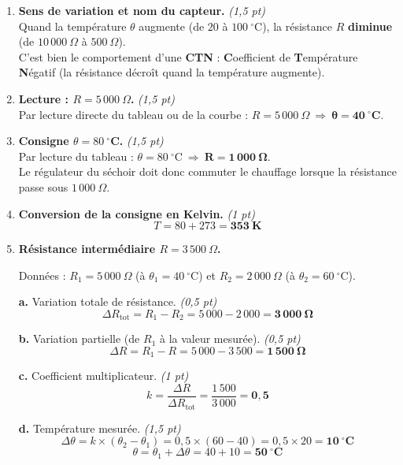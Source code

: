 \documentclass[a4paper,11pt]{article}
\begin{document}
\begin{enumerate}[label=\textbf{\arabic*.},leftmargin=*,itemsep=4pt]

\item \textbf{Sens de variation et nom du capteur.} \hfill\textit{\small(1,5 pt)}\\
Quand la température $\theta$ augmente (de $20$ à $100\ ^\circ$C), la résistance $R$ \textbf{diminue} (de $10\,000\ \Omega$ à $500\ \Omega$). \\
C'est bien le comportement d'une \textbf{CTN} : \textbf{C}oefficient de \textbf{T}empérature \textbf{N}égatif (la résistance décroît quand la température augmente).

\item \textbf{Lecture : $R = 5\,000\ \Omega$.} \hfill\textit{\small(1,5 pt)}\\
Par lecture directe du tableau ou de la courbe : $R = 5\,000\ \Omega \ \Rightarrow\ \mathbf{\theta = 40\ ^\circ\text{C}}$.

\item \textbf{Consigne $\theta = 80\ ^\circ$C.} \hfill\textit{\small(1,5 pt)}\\
Par lecture du tableau : $\theta = 80\ ^\circ\text{C}\ \Rightarrow\ \mathbf{R = 1\,000\ \Omega}$.\\
Le régulateur du séchoir doit donc commuter le chauffage lorsque la résistance passe sous $1\,000\ \Omega$.

\item \textbf{Conversion de la consigne en Kelvin.} \hfill\textit{\small(1 pt)}
\[ T = 80 + 273 = \mathbf{353\ \text{K}} \]

\item \textbf{Résistance intermédiaire $R = 3\,500\ \Omega$.}

Données : $R_1 = 5\,000\ \Omega$ (à $\theta_1 = 40\ ^\circ$C) et $R_2 = 2\,000\ \Omega$ (à $\theta_2 = 60\ ^\circ$C).

\textbf{a.} Variation totale de résistance. \hfill\textit{\small(0,5 pt)}
\[ \Delta R_{\text{tot}} = R_1 - R_2 = 5\,000 - 2\,000 = \mathbf{3\,000\ \Omega} \]

\textbf{b.} Variation partielle (de $R_1$ à la valeur mesurée). \hfill\textit{\small(0,5 pt)}
\[ \Delta R = R_1 - R = 5\,000 - 3\,500 = \mathbf{1\,500\ \Omega} \]

\textbf{c.} Coefficient multiplicateur. \hfill\textit{\small(1 pt)}
\[ k = \frac{\Delta R}{\Delta R_{\text{tot}}} = \frac{1\,500}{3\,000} = \mathbf{0{,}5} \]

\textbf{d.} Température mesurée. \hfill\textit{\small(1,5 pt)}
\[ \Delta\theta = k \times (\theta_2 - \theta_1) = 0{,}5 \times (60 - 40) = 0{,}5 \times 20 = \mathbf{10\ ^\circ\text{C}} \]
\[ \theta = \theta_1 + \Delta\theta = 40 + 10 = \mathbf{50\ ^\circ\text{C}} \]

\end{enumerate}
\end{document}
